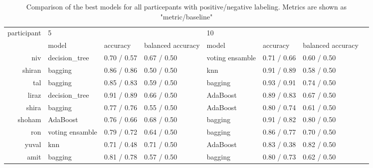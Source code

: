 \documentclass[../main.tex]{subfiles}
\begin{document}
\begin{table}[!h]
    \begin{tabular}{rlllllll}
        \toprule
        participant &      \multicolumn{3}{l}{5} & \multicolumn{3}{l}{10} \\
              &             model &     accuracy & balanced accuracy &            model &     accuracy & balanced accuracy \\
        \midrule
             niv &    decision\_tree &  0.70 / 0.57 &       0.67 / 0.50 &  voting ensamble &  0.71 / 0.66 &       0.60 / 0.50 \\
          shiran &          bagging &  0.86 / 0.86 &       0.50 / 0.50 &              knn &  0.91 / 0.89 &       0.58 / 0.50 \\
             tal &          bagging &  0.85 / 0.83 &       0.59 / 0.50 &          bagging &  0.93 / 0.91 &       0.74 / 0.50 \\
           liraz &    decision\_tree &  0.91 / 0.89 &       0.66 / 0.50 &         AdaBoost &  0.89 / 0.83 &       0.67 / 0.50 \\
           shira &          bagging &  0.77 / 0.76 &       0.55 / 0.50 &         AdaBoost &  0.80 / 0.74 &       0.61 / 0.50 \\
          shoham &         AdaBoost &  0.76 / 0.66 &       0.68 / 0.50 &          bagging &  0.91 / 0.82 &       0.80 / 0.50 \\
             ron &  voting ensamble &  0.79 / 0.72 &       0.64 / 0.50 &          bagging &  0.86 / 0.77 &       0.70 / 0.50 \\
           yuval &              knn &  0.71 / 0.48 &       0.71 / 0.50 &         AdaBoost &  0.83 / 0.38 &       0.82 / 0.50 \\
            amit &          bagging &  0.81 / 0.78 &       0.57 / 0.50 &          bagging &  0.80 / 0.73 &       0.62 / 0.50 \\
        \bottomrule
    \end{tabular}
    \caption{Comparison of the best models for all particepants with positive/negative labeling. Metrics are shown as "metric/baseline"}
\end{table}
\end{document}
